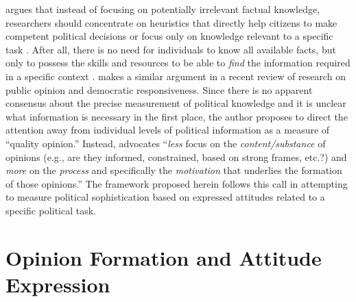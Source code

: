 \documentclass[12pt]{article}
\begin{document}
\citet{lupia2006elitism} argues that instead of focusing on potentially irrelevant factual knowledge, researchers should concentrate on heuristics that directly help citizens to make competent political decisions or focus only on knowledge relevant to a specific task \citep[see also][]{lupia1994shortcuts,lupia2015uninformed}. After all, there is no need for individuals to know all available facts, but only to possess the skills and resources to be able to \textit{find} the information required in a specific context \citep{prior2008money}. \citet{druckman2014pathologies} makes a similar argument in a recent review of research on public opinion and democratic responsiveness. Since there is no apparent consensus about the precise measurement of political knowledge and it is unclear what information is necessary in the first place, the author proposes to direct the attention away from individual levels of political information as a measure of ``quality opinion.'' Instead, \citet[478, emphasis in the original]{druckman2014pathologies} advocates ``\textit{less} focus on the \textit{content/substance} of opinions (e.g., are they informed, constrained, based on strong frames, etc.?) and \textit{more} on the \textit{process} and specifically the \textit{motivation} that underlies the formation of those opinions.'' The framework proposed herein follows this call in attempting to measure political sophistication based on expressed attitudes related to a specific political task.


\section*{Opinion Formation and Attitude Expression}
\end{document}

